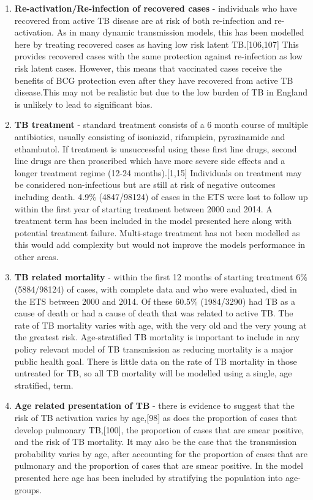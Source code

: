 \documentclass[11pt,twoside]{bristolthesis}
\begin{document}
\begin{enumerate}
  \item
    \textbf{Re-activation/Re-infection of recovered cases} - individuals who have recovered from active TB disease are at risk of both re-infection and re-activation. As in many dynamic transmission models, this has been modelled here by treating recovered cases as having low risk latent TB.{[}106,107{]} This provides recovered cases with the same protection against re-infection as low risk latent cases. However, this means that vaccinated cases receive the benefits of BCG protection even after they have recovered from active TB disease.This may not be realistic but due to the low burden of TB in England is unlikely to lead to significant bias.
  \item
    \textbf{TB treatment} - standard treatment consists of a 6 month course of multiple antibiotics, usually consisting of isoniazid, rifampicin, pyrazinamide and ethambutol. If treatment is unsuccessful using these first line drugs, second line drugs are then proscribed which have more severe side effects and a longer treatment regime (12-24 months).{[}1,15{]} Individuals on treatment may be considered non-infectious but are still at risk of negative outcomes including death. 4.9\% (4847/98124) of cases in the ETS were lost to follow up within the first year of starting treatment between 2000 and 2014. A treatment term has been included in the model presented here along with potential treatment failure. Multi-stage treatment has not been modelled as this would add complexity but would not improve the models performance in other areas.
  \item
    \textbf{TB related mortality} - within the first 12 months of starting treatment 6\% (5884/98124) of cases, with complete data and who were evaluated, died in the ETS between 2000 and 2014. Of these 60.5\% (1984/3290) had TB as a cause of death or had a cause of death that was related to active TB. The rate of TB mortality varies with age, with the very old and the very young at the greatest risk. Age-stratified TB mortality is important to include in any policy relevant model of TB transmission as reducing mortality is a major public health goal. There is little data on the rate of TB mortality in those untreated for TB, so all TB mortality will be modelled using a single, age stratified, term.
  \item
    \textbf{Age related presentation of TB} - there is evidence to suggest that the risk of TB activation varies by age,{[}98{]} as does the proportion of cases that develop pulmonary TB,{[}100{]}, the proportion of cases that are smear positive, and the risk of TB mortality. It may also be the case that the transmission probability varies by age, after accounting for the proportion of cases that are pulmonary and the proportion of cases that are smear positive. In the model presented here age has been included by stratifying the population into age-groups.

\end{enumerate}
\end{document}
